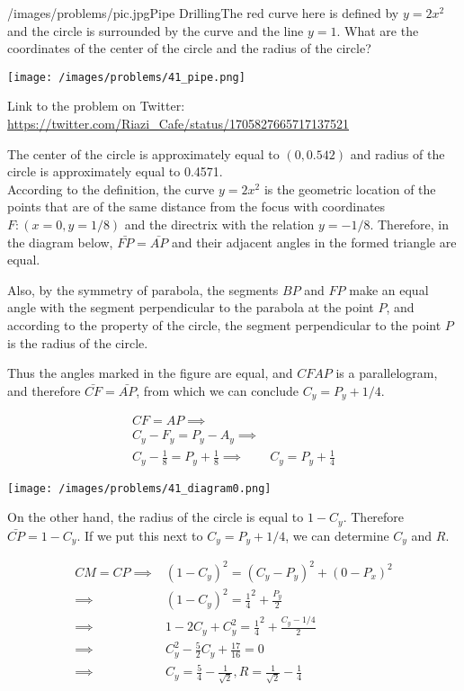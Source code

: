 \begin{problem}{/images/problems/pic.jpg}{Pipe Drilling}The red curve here is defined by $y = 2x^2$ and the circle is surrounded by the curve and the line $y=1$. What are the coordinates of the center of the circle and the radius of the circle?

\begin{center}
	\texttt{[image: /images/problems/41\_pipe.png]}
\end{center}

Link to the problem on Twitter: \url{https://twitter.com/Riazi_Cafe/status/1705827665717137521}\end{problem}
\begin{solution}
The center of the circle is approximately equal to $(0,0.542)$ and radius of the circle is approximately equal to 0.4571.\\[0.2cm]

According to the definition, the curve $y=2x^2$ is the geometric location of the points that are of the same distance from the focus with coordinates $F: (x=0, y=1/8)$ and the directrix with the relation $y=-1/8$.
Therefore, in the diagram below, $\bar{FP}=\bar{AP}$ and their adjacent angles in the formed triangle are equal.

Also, by the symmetry of parabola, the segments $BP$ and $FP$ make an equal angle with the segment perpendicular to the parabola at the point $P$, and according to the property of the circle, the segment perpendicular to the point $P$ is the radius of the circle.

Thus the angles marked in the figure are equal, and $CFAP$ is a parallelogram, and therefore $\bar{CF}=\bar{AP}$, from which we can conclude $C_y=P_y+1/4$.

$$\begin{aligned}
CF = AP \implies& \\
C_y - F_y = P_y - A_y \implies& \\
C_y - \frac{1}{8} = P_y + \frac{1}{8} \implies& C_y=P_y+\frac{1}{4}
\end{aligned}$$

\begin{center}
	\texttt{[image: /images/problems/41\_diagram0.png]}
\end{center}

On the other hand, the radius of the circle is equal to $1-C_y$. Therefore $\bar{CP}=1-C_y$. If we put this next to $C_y=P_y+1/4$, we can determine $C_y$ and $R$.

$$\begin{aligned}
CM = CP \implies& (1 - C_y)^2 = (C_y - P_y)^2 + (0 - P_x)^2 \\
\implies& (1 - C_y)^2 = \frac{1}{4}^2 + \frac{P_y}{2} \\
\implies& 1 - 2C_y + C_y^2  = \frac{1}{4}^2 + \frac{C_y-1/4}{2} \\
\implies& C_y^2 - \frac{5}{2}C_y + \frac{17}{16} = 0 \\
\implies& C_y = \frac{5}{4} - \frac{1}{\sqrt{2}}, R = \frac{1}{\sqrt{2}} - \frac{1}{4}
\end{aligned}$$

\end{solution}

